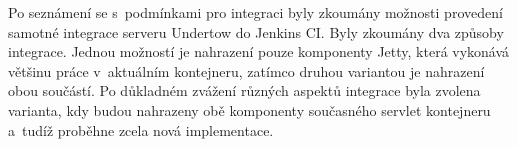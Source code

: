     Po seznámení se s~podmínkami pro integraci byly
    zkoumány možnosti provedení samotné integrace serveru Undertow do Jenkins CI.
    Byly zkoumány dva způsoby integrace. Jednou možností je nahrazení pouze komponenty
    Jetty, která vykonává většinu práce v~aktuálním kontejneru, zatímco druhou variantou je
    nahrazení obou součástí. 
    Po důkladném zvážení různých aspektů integrace byla 
    zvolena varianta, kdy budou nahrazeny obě komponenty současného 
    servlet kontejneru a~tudíž proběhne zcela nová implementace.







